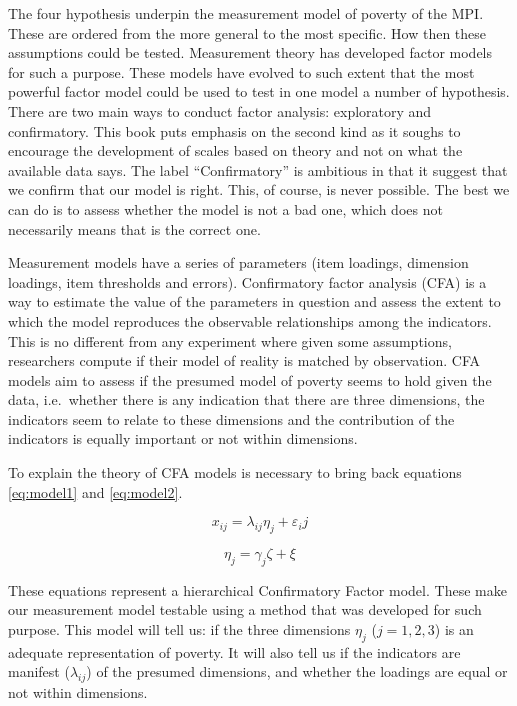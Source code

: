 \documentclass[]{book}
\begin{document}
The four hypothesis underpin the measurement model of poverty of the MPI. These are ordered from the more general to the most specific. How then these assumptions could be tested. Measurement theory has developed factor models for such a purpose. These models have evolved to such extent that the most powerful factor model could be used to test in one model a number of hypothesis. There are two main ways to conduct factor analysis: exploratory and confirmatory. This book puts emphasis on the second kind as it soughs to encourage the development of scales based on theory and not on what the available data says. The label ``Confirmatory'' is ambitious in that it suggest that we confirm that our model is right. This, of course, is never possible. The best we can do is to assess whether the model is not a bad one, which does not necessarily means that is the correct one.

Measurement models have a series of parameters (item loadings, dimension loadings, item thresholds and errors). Confirmatory factor analysis (CFA) is a way to estimate the value of the parameters in question and assess the extent to which the model reproduces the observable relationships among the indicators. This is no different from any experiment where given some assumptions, researchers compute if their model of reality is matched by observation. CFA models aim to assess if the presumed model of poverty seems to hold given the data, i.e.~whether there is any indication that there are three dimensions, the indicators seem to relate to these dimensions and the contribution of the indicators is equally important or not within dimensions.

To explain the theory of CFA models is necessary to bring back equations \eqref{eq:model1} and \eqref{eq:model2}.

\begin{equation}
 x_{ij} = \lambda_{ij} \eta_j + \varepsilon_ij   
\end{equation}

\begin{equation}
 \eta_j = \gamma_{j} \zeta  + \xi
\end{equation}

These equations represent a hierarchical Confirmatory Factor model. These make our measurement model testable using a method that was developed for such purpose. This model will tell us: if the three dimensions \(\eta_j\) (\(j=1,2,3\)) is an adequate representation of poverty. It will also tell us if the indicators are manifest (\(\lambda_{ij}\)) of the presumed dimensions, and whether the loadings are equal or not within dimensions.
\end{document}
